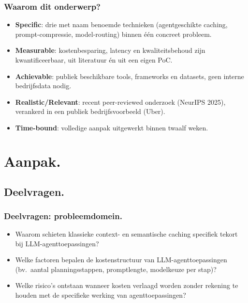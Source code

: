 \documentclass[aspectratio=169]{beamer}
\begin{document}
\begin{frame}
    \frametitle{Waarom dit onderwerp?}

    \small
    \begin{itemize}
        \item \textbf{Specific}: drie met naam benoemde technieken
            (agentgeschikte caching, prompt-compressie, model-routing)
            binnen \'e\'en concreet probleem.
        \item \textbf{Measurable}: kostenbesparing, latency en
            kwaliteitsbehoud zijn kwantificeerbaar, uit literatuur \'en
            uit een eigen PoC.
        \item \textbf{Achievable}: publiek beschikbare tools, frameworks
            en datasets, geen interne bedrijfsdata nodig.
        \item \textbf{Realistic/Relevant}: recent peer-reviewed onderzoek
            (NeurIPS 2025), verankerd in een publiek bedrijfsvoorbeeld
            (Uber).
        \item \textbf{Time-bound}: volledige aanpak uitgewerkt binnen
            twaalf weken.
    \end{itemize}
\end{frame}


\section{Aanpak.}

\subsection{Deelvragen.}

\begin{frame}
    \frametitle{Deelvragen: probleemdomein.}

    \begin{itemize}
        \item Waarom schieten klassieke context- en semantische caching
            specifiek tekort bij LLM-agenttoepassingen?
        \item Welke factoren bepalen de kostenstructuur van
            LLM-agenttoepassingen (bv.\ aantal planningsstappen,
            promptlengte, modelkeuze per stap)?
        \item Welke risico's ontstaan wanneer kosten verlaagd worden
            zonder rekening te houden met de specifieke werking van
            agenttoepassingen?
    \end{itemize}
\end{frame}
\end{document}
